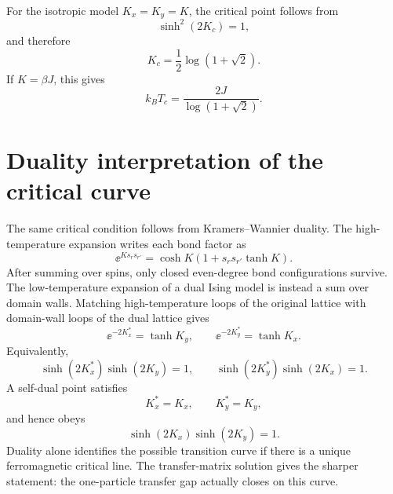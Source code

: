 For the isotropic model $K_x=K_y=K$, the critical point follows from
\begin{equation}
    \sinh^2(2K_c)=1,
\end{equation}
and therefore
\begin{equation}
\label{eq:2d-classical-ising-isotropic-kc}
    \boxed{K_c=\frac12\log(1+\sqrt2).}
\end{equation}
If $K=\beta J$, this gives
\begin{equation}
\label{eq:2d-classical-ising-isotropic-tc}
    k_B T_c
    =
    \frac{2J}{\log(1+\sqrt2)} .
\end{equation}

\section{Duality interpretation of the critical curve}
\label{sec:2d-classical-ising-duality-interpretation}

The same critical condition follows from Kramers--Wannier duality.  The
high-temperature expansion writes each bond factor as
\begin{equation}
\label{eq:2d-classical-ising-high-temp-bond}
    \ee^{Ks_rs_{r'}}
    =
    \cosh K\left(1+s_rs_{r'}\tanh K\right).
\end{equation}
After summing over spins, only closed even-degree bond configurations survive.
The low-temperature expansion of a dual Ising model is instead a sum over domain
walls.  Matching high-temperature loops of the original lattice with
domain-wall loops of the dual lattice gives
\begin{equation}
\label{eq:2d-classical-ising-dual-couplings}
    \ee^{-2K_x^*}=\tanh K_y,
    \qquad
    \ee^{-2K_y^*}=\tanh K_x .
\end{equation}
Equivalently,
\begin{equation}
\label{eq:2d-classical-ising-dual-couplings-sinh}
    \sinh(2K_x^*)\sinh(2K_y)=1,
    \qquad
    \sinh(2K_y^*)\sinh(2K_x)=1 .
\end{equation}
A self-dual point satisfies
\begin{equation}
    K_x^*=K_x,
    \qquad
    K_y^*=K_y,
\end{equation}
and hence obeys
\begin{equation}
    \sinh(2K_x)\sinh(2K_y)=1 .
\end{equation}
Duality alone identifies the possible transition curve if there is a unique
ferromagnetic critical line.  The transfer-matrix solution gives the sharper
statement: the one-particle transfer gap actually closes on this curve.

